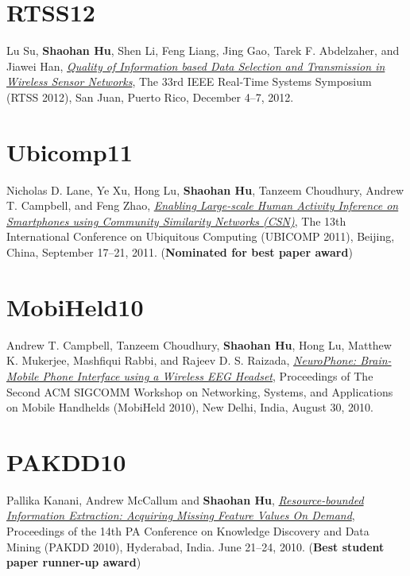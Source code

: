 \section{\sc RTSS12}\hypertarget{su2012rtss}{}
Lu Su, \textbf{Shaohan Hu}, Shen Li, Feng Liang, Jing Gao, Tarek
F. Abdelzaher, and Jiawei Han, \href{http://ieeexplore.ieee.org/xpl/articleDetails.jsp?arnumber=6424815}{\emph{Quality of Information based Data
  Selection and Transmission in Wireless Sensor Networks}}, \textsf{The
  33rd IEEE Real-Time Systems Symposium (RTSS 2012)}, San Juan, Puerto
Rico, December 4--7, 2012.

\section{\sc Ubicomp11}\hypertarget{lane2011ubicomp}{}
Nicholas D. Lane, Ye Xu, Hong Lu, \textbf{Shaohan Hu}, Tanzeem
Choudhury, Andrew T. Campbell, and Feng Zhao, \href{http://portal.acm.org/citation.cfm?id=2030160}{\emph{Enabling
  Large-scale Human Activity Inference on Smartphones using Community
  Similarity Networks (CSN)}}, \textsf{The 13th International
  Conference on Ubiquitous Computing (UBICOMP 2011)}, Beijing, China,
September 17--21, 2011. (\textbf{Nominated for best paper award})

\section{\sc MobiHeld10}\hypertarget{campbell2010mobiheld}{}
Andrew T. Campbell, Tanzeem Choudhury, \textbf{Shaohan Hu}, Hong Lu,
Matthew K. Mukerjee, Mashfiqui Rabbi, and Rajeev D. S. Raizada,
\href{http://portal.acm.org/citation.cfm?id=1851326}{\emph{NeuroPhone: Brain-Mobile Phone Interface using a Wireless EEG
  Headset}}, \textsf{Proceedings of The Second ACM SIGCOMM Workshop on
  Networking, Systems, and Applications on Mobile Handhelds (MobiHeld
  2010)}, New Delhi, India, August 30, 2010.

\section{\sc PAKDD10}\hypertarget{kanani2010pakdd}{}
Pallika Kanani, Andrew McCallum and \textbf{Shaohan Hu},
\href{http://www.springerlink.com/content/j41w758434321108}{\emph{Resource-bounded Information Extraction: Acquiring Missing
  Feature Values On Demand}}, \textsf{Proceedings of the 14th PA
  Conference on Knowledge Discovery and Data Mining (PAKDD 2010)},
Hyderabad, India. June 21--24, 2010. (\textbf{Best student paper runner-up award})

